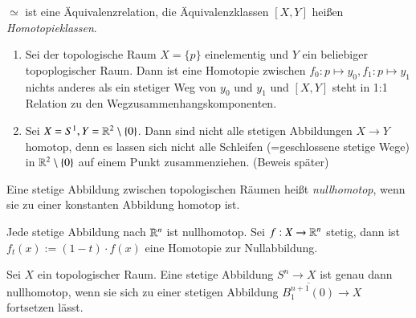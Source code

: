 \documentclass[a4paper,10pt]{scrartcl}
\begin{document}
$\simeq$ ist eine Äquivalenzrelation, die Äquivalenzklassen $[X,Y]$ heißen \emph{Homotopieklassen}.  
\begin{exs*}
 \begin{enumerate}
  \item Sei der topologische Raum $X=\{p\}$ einelementig und $Y$ ein beliebiger topoplogischer Raum.  Dann ist eine Homotopie zwischen $f_0: p\mapsto y_0, f_1: p\mapsto y_1$ nichts anderes als ein stetiger Weg von $y_0$ und $y_1$ und $[X,Y]$ steht in 1:1 Relation zu den Wegzusammenhangskomponenten.
  \item Sei $X=S^1, Y=\mathbb{R}^2\setminus \{0\}$. Dann sind nicht alle stetigen Abbildungen $X\to Y$ homotop, denn es lassen sich nicht alle Schleifen (=geschlossene stetige Wege) in $\mathbb{R}^2\setminus\{0\}$   auf einem Punkt zusammenziehen. (Beweis später)
\begin{figure}[H]
\centering
 \fixme[fig40]
\caption{}
\end{figure}
\end{enumerate}
\end{exs*}
\begin{df}
 Eine stetige Abbildung zwischen topologischen Räumen heißt \emph{nullhomotop}, wenn sie zu einer konstanten Abbildung homotop ist. 
\end{df}
\begin{figure}[H]
\centering
 \fixme[fig41]
\caption{}
\end{figure}
\begin{ex*}
 Jede stetige Abbildung nach $\mathbb{R}^n$ ist nullhomotop. Sei $f: X\to \mathbb{R}^n$ stetig, dann ist $f_t(x):= (1-t)\cdot f(x)$ eine Homotopie zur Nullabbildung. 
\end{ex*}
\begin{st}
 Sei $X$ ein topologischer Raum.  Eine stetige Abbildung $S^n\to X$ ist genau dann nullhomotop, wenn sie sich zu einer stetigen Abbildung $\overline{B_1^{n+1}(0)}\to X$ fortsetzen lässt.
\end{st}
\end{document}
